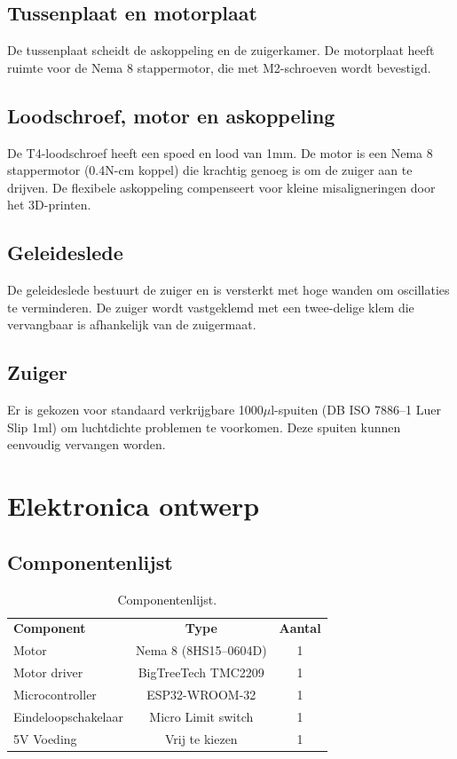 \subsection{Tussenplaat en motorplaat}
De tussenplaat scheidt de askoppeling en de zuigerkamer. De motorplaat heeft ruimte voor de Nema 8 stappermotor, die met M2-schroeven wordt bevestigd.

\subsection{Loodschroef, motor en askoppeling}
De T4-loodschroef heeft een spoed en lood van 1mm. De motor is een Nema 8 stappermotor (0.4N-cm koppel) die krachtig genoeg is om de zuiger aan te drijven. De flexibele askoppeling compenseert voor kleine misaligneringen door het 3D-printen.

\subsection{Geleideslede}
De geleideslede bestuurt de zuiger en is versterkt met hoge wanden om oscillaties te verminderen. De zuiger wordt vastgeklemd met een twee-delige klem die vervangbaar is afhankelijk van de zuigermaat.

\subsection{Zuiger}
Er is gekozen voor standaard verkrijgbare 1000$\mu$l-spuiten (DB ISO 7886--1 Luer Slip 1ml) om luchtdichte problemen te voorkomen. Deze spuiten kunnen eenvoudig vervangen worden.

\section{Elektronica ontwerp}
\subsection{Componentenlijst}
\begin{table}[H] 
    \begin{tabular}{l|c|c} 
        \textbf{Component} & \textbf{Type} & \textbf{Aantal} \\
        Motor & Nema 8 (8HS15--0604D) & 1 \\
        Motor driver & BigTreeTech TMC2209 & 1 \\
        Microcontroller & ESP32-WROOM-32 & 1 \\
        Eindeloopschakelaar & Micro Limit switch & 1 \\
        5V Voeding & Vrij te kiezen\footnotemark & 1 \\
    \end{tabular} 
    \caption{Componentenlijst.}\label{tab:componentenlijst} 
\end{table}

